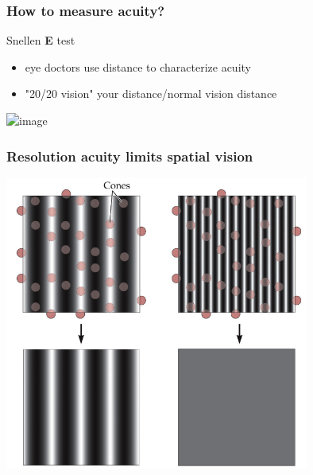 \documentclass[]{beamer}
\begin{document}
\begin{frame}
\frametitle{How to measure acuity?}
\begin{overlayarea}{110mm}{60mm}
Snellen \textbf{E} test
\begin{itemize} 
 \item eye doctors use distance to characterize acuity
 \item "20/20 vision" your distance/normal vision distance
\end{itemize}
  \begin{center}
\includegraphics<1>[width=50mm]{figs/l3/snellen_E.png}
 \end{center}
\end{overlayarea}
\end{frame}

\begin{frame}
\frametitle{Resolution acuity limits spatial vision}
  \begin{center}
\includegraphics[width=100mm]{figs/l3/grating_sampling.png}
 \end{center}
\end{frame}
\end{document}
